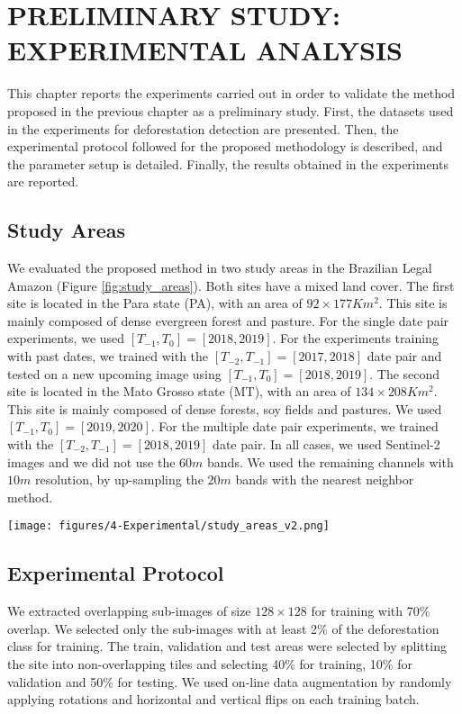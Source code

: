 \chapter{PRELIMINARY STUDY: EXPERIMENTAL ANALYSIS}\label{sect:Results}

This chapter reports the experiments carried out in order to validate the method proposed in the previous chapter as a preliminary study. First, the datasets used in the experiments for deforestation detection are presented. Then, the experimental protocol followed for the proposed  methodology is described, and the parameter setup is detailed. Finally, the results obtained in the experiments are reported.

\section{Study Areas}\label{sect:Datasets}

We evaluated the proposed method in two study areas in the Brazilian Legal Amazon (Figure \ref{fig:study_areas}). Both sites have a mixed land cover. The first site is located in the Para state (PA), with an area of $92\times 177 Km^2$. This site is mainly composed of dense evergreen forest and pasture. For the single date pair experiments, we used $[T_{-1}, T_0]=[2018, 2019]$. For the experiments training with past dates, we trained with the $[T_{-2}, T_{-1}]=[2017, 2018]$ date pair and tested on a new upcoming image using $[T_{-1}, T_0]=[2018, 2019]$. The second site is located in the Mato Grosso state (MT), with an area of $134\times 208 Km^2$. This site is mainly composed of dense forests, soy fields and pastures. We used $[T_{-1}, T_0]=[2019, 2020]$. For the multiple date pair experiments, we trained with the $[T_{-2}, T_{-1}]=[2018, 2019]$ date pair. In all cases, we used Sentinel-2 images and we did not use the 60$m$ bands. We used the remaining channels with $10m$ resolution, by up-sampling the $20m$ bands with the nearest neighbor method.

\begin{figure*}[ht!]
    \centering
		\texttt{[image: figures/4-Experimental/study\_areas\_v2.png]}
	\caption{Geographical location of the study areas, and RGB composition of the corresponding Sentinel-2 images acquired at $T_{-1}$.}
\label{fig:study_areas} %
\end{figure*}



\section{Experimental Protocol}
We extracted overlapping sub-images of size $128\times 128$ for training with 70\% overlap. We selected only the sub-images with at least 2\% of the deforestation class for training. The train, validation and test areas were selected by splitting the site into non-overlapping tiles and selecting 40\% for training, 10\% for validation and 50\% for testing. We used on-line data augmentation by randomly applying rotations and horizontal and vertical flips on each training batch.

